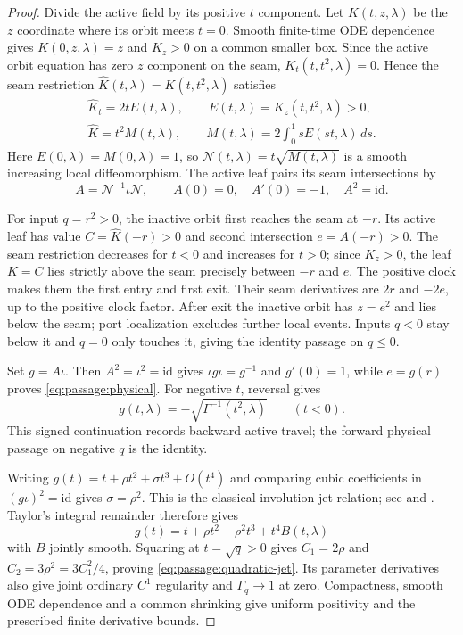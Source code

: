 \begin{proof}
Divide the active field by its positive $t$ component. Let
$K(t,z,\lambda)$ be the $z$ coordinate where its orbit meets $t=0$.
Smooth finite-time ODE dependence gives $K(0,z,\lambda)=z$ and $K_z>0$
on a common smaller box. Since the active orbit equation has zero
$z$ component on the seam, $K_t(t,t^2,\lambda)=0$. Hence the seam
restriction $\widehat K(t,\lambda)=K(t,t^2,\lambda)$ satisfies
\[
 \begin{gathered}
 \widehat K_t=2tE(t,\lambda),\qquad
 E(t,\lambda)=K_z(t,t^2,\lambda)>0,\\
 \widehat K=t^2M(t,\lambda),\qquad
 M(t,\lambda)=2\int_0^1 sE(st,\lambda)\,ds.
 \end{gathered}
\]
Here $E(0,\lambda)=M(0,\lambda)=1$, so
$\mathcal N(t,\lambda)=t\sqrt{M(t,\lambda)}$ is a smooth increasing
local diffeomorphism. The active leaf pairs its seam intersections by
\[
 A=\mathcal N^{-1}\iota\mathcal N,\qquad
 A(0)=0,\quad A'(0)=-1,\quad A^2=\mathrm{id}.
\]

For input $q=r^2>0$, the inactive orbit first reaches the seam at $-r$.
Its active leaf has value $C=\widehat K(-r)>0$ and second intersection
$e=A(-r)>0$. The seam restriction decreases for $t<0$ and increases
for $t>0$; since $K_z>0$, the leaf $K=C$ lies strictly above the seam
precisely between $-r$ and $e$. The positive clock makes them the first
entry and first exit. Their seam derivatives are $2r$ and $-2e$, up
to the positive clock factor. After exit the inactive orbit has $z=e^2$
and lies below the seam; port localization excludes further local events.
Inputs $q<0$ stay below it and $q=0$ only touches it, giving the identity
passage on $q\le0$.

Set $g=A\iota$. Then $A^2=\iota^2=\mathrm{id}$ gives
$\iota g\iota=g^{-1}$ and $g'(0)=1$, while $e=g(r)$ proves
\eqref{eq:passage:physical}. For negative $t$, reversal gives
\begin{equation}\label{eq:passage:negative-companion}
 g(t,\lambda)=-\sqrt{\Gamma^{-1}(t^2,\lambda)}\qquad(t<0).
\end{equation}
This signed continuation records backward active travel; the forward
physical passage on negative $q$ is the identity.

Writing $g(t)=t+\rho t^2+\sigma t^3+O(t^4)$ and comparing cubic
coefficients in $(g\iota)^2=\mathrm{id}$ gives $\sigma=\rho^2$.
This is the classical involution jet relation; see
\cite[Corollary~1 and Proposition~4, arXiv author version]{novaessilva2021}
and \cite[Lemma~16, March 2006 author manuscript]{ofarrell2008}.
Taylor's integral remainder therefore gives
\[
 g(t)=t+\rho t^2+\rho^2t^3+t^4B(t,\lambda)
\]
with $B$ jointly smooth. Squaring at $t=\sqrt q>0$ gives
$C_1=2\rho$ and $C_2=3\rho^2=3C_1^2/4$, proving
\eqref{eq:passage:quadratic-jet}. Its parameter derivatives also give
joint ordinary $C^1$ regularity and $\Gamma_q\to1$ at zero.
Compactness, smooth ODE dependence and a common shrinking give uniform
positivity and the prescribed finite derivative bounds.
\end{proof}

